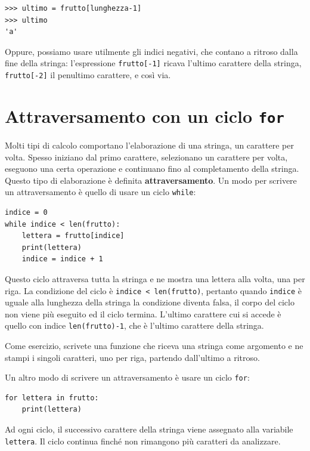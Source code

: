 \documentclass[10pt]{book}
\begin{document}
\begin{verbatim}
>>> ultimo = frutto[lunghezza-1]
>>> ultimo
'a'
\end{verbatim}
%
Oppure, possiamo usare utilmente gli indici negativi, che contano a ritroso dalla fine della stringa: l'espressione {\tt frutto[-1]} ricava l'ultimo carattere della stringa, {\tt frutto[-2]} il penultimo carattere, e così via.


\section{Attraversamento con un ciclo {\tt for}}
\label{for}

Molti tipi di calcolo comportano l'elaborazione di una stringa, un carattere per volta. Spesso iniziano dal primo carattere, selezionano un carattere per volta, eseguono una certa operazione e continuano fino al completamento della stringa. Questo tipo di elaborazione è definita {\bf attraversamento}. Un modo per scrivere un attraversamento è quello di usare un ciclo {\tt while}:

\begin{verbatim}
indice = 0
while indice < len(frutto):
    lettera = frutto[indice]
    print(lettera)
    indice = indice + 1
\end{verbatim}
%
Questo ciclo attraversa tutta la stringa e ne mostra una lettera alla volta,    una per riga. La condizione del ciclo è {\tt indice < len(frutto)}, pertanto   quando {\tt indice} è uguale alla lunghezza della stringa la condizione diventa falsa, il corpo del ciclo non viene più eseguito ed il ciclo termina. L'ultimo carattere cui si accede è quello con indice {\tt len(frutto)-1}, che è l'ultimo carattere della stringa.

Come esercizio, scrivete una funzione che riceva una stringa come argomento e ne stampi i singoli caratteri, uno per riga, partendo dall'ultimo a ritroso.

Un altro modo di scrivere un attraversamento è usare un ciclo {\tt for}:

\begin{verbatim}
for lettera in frutto:
    print(lettera)
\end{verbatim}
%
Ad ogni ciclo, il successivo carattere della stringa viene assegnato alla variabile {\tt lettera}. Il ciclo continua finché non rimangono più caratteri da analizzare.
\end{document}
